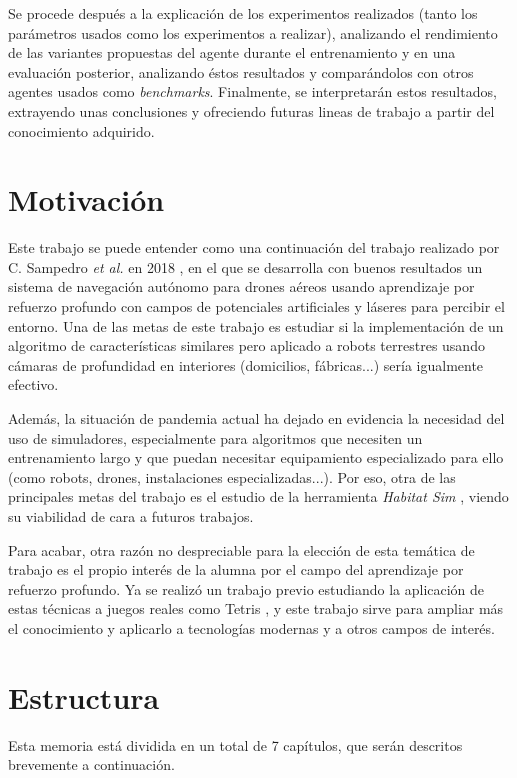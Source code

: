 Se procede después a la explicación de los experimentos realizados (tanto los parámetros usados como los experimentos a realizar), analizando el rendimiento de las variantes propuestas del agente durante el entrenamiento y en una evaluación posterior, analizando éstos resultados y comparándolos con otros agentes usados como \textit{benchmarks}. Finalmente, se interpretarán estos resultados, extrayendo unas conclusiones y ofreciendo futuras lineas de trabajo a partir del conocimiento adquirido.

\section{Motivación}

Este trabajo se puede entender como una continuación del trabajo realizado por C. Sampedro \textit{et al.} en 2018 \cite{Sampedro2018}, en el que se desarrolla con buenos resultados un sistema de navegación autónomo para drones aéreos usando aprendizaje por refuerzo profundo con campos de potenciales artificiales y láseres para percibir el entorno. Una de las metas de este trabajo es estudiar si la implementación de un algoritmo de características similares pero aplicado a robots terrestres usando cámaras de profundidad en interiores (domicilios, fábricas...) sería igualmente efectivo.

Además, la situación de pandemia actual ha dejado en evidencia la necesidad del uso de simuladores, especialmente para algoritmos que necesiten un entrenamiento largo y que puedan necesitar equipamiento especializado para ello (como robots, drones, instalaciones especializadas...). Por eso, otra de las principales metas del trabajo es el estudio de la herramienta \textit{Habitat Sim} \cite{habitat19iccv} \cite{szot2021habitat}, viendo su viabilidad de cara a futuros trabajos.

Para acabar, otra razón no despreciable para la elección de esta temática de trabajo es el propio interés de la alumna por el campo del aprendizaje por refuerzo profundo. Ya se realizó un trabajo previo estudiando la aplicación de estas técnicas a juegos reales como Tetris \cite{Jimenez2020}, y este trabajo sirve para ampliar más el conocimiento y aplicarlo a tecnologías modernas y a otros campos de interés.

\section{Estructura}


Esta memoria está dividida en un total de 7 capítulos, que serán descritos brevemente a continuación.

